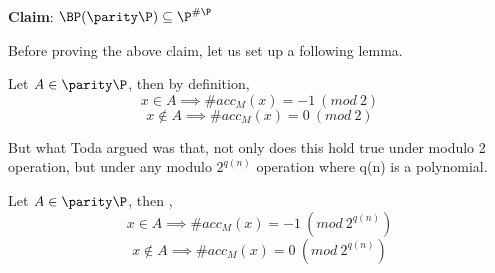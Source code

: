 \documentclass[11pt]{article}
\begin{document}

\textbf{Claim}: $\BP(\parity\P) \subseteq \P^{\#\P}$

Before proving the above claim, let us set up a following lemma. \newline

Let $A \in \parity \P$, then by definition, \newline
$$x \in A \implies \#acc_{M}(x) = -1~(mod~2)$$ 
$$x \notin A \implies \#acc_{M}(x) = 0~(mod~2)$$

But what Toda argued was that, not only does this hold true under modulo 2 operation, but under any modulo $2^{q(n)}$ operation where q(n) is a polynomial.

\begin{lemma}
 Let $A \in \parity \P$, then , \newline
$$x \in A \implies \#acc_{M}(x) = -1~(mod~2^{q(n)})$$ 
$$x \notin A \implies \#acc_{M}(x) = 0~(mod~2^{q(n)})$$
 
\end{lemma}
\end{document}
